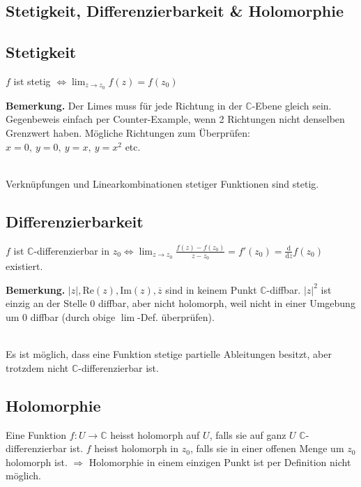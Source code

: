 \documentclass[8pt, a4paper, landscape, fleqn]{scrartcl}
\newenvironment {example}
				{\begin{itshape} \begin{small}}
				{\end{small} \end{itshape}}
\def\C{\mathbb{C}}
\def\d{\text{d}}
\def\Re{\text{Re}}
\def\Im{\text{Im}}
\newcommand{\blue}[1]{\textcolor{ethblue}{#1}}
\begin{document}
\begin{multicols*}{3}
		\section{Stetigkeit, Differenzierbarkeit \& Holomorphie}
		\subsection{Stetigkeit}
		$f$ ist \blue{stetig} $\Leftrightarrow \lim_{z \to z_0} f(z) = f(z_0)$ \vspace{5pt}
	
		\begin{example}
		    \textbf{Bemerkung.}
		    Der Limes muss für jede Richtung in der $\C$-Ebene gleich sein. Gegenbeweis einfach per Counter-Example, wenn 2 Richtungen nicht denselben Grenzwert haben. Mögliche Richtungen zum Überprüfen: $x = 0, \ y = 0, \ y = x, \ y = x^2$ etc.
		\end{example} \\
	    
	    Verknüpfungen und Linearkombinationen stetiger Funktionen sind stetig.
	
	    \subsection{Differenzierbarkeit}
	    $f$ ist \blue{$\C$-differenzierbar} in $z_0 \Leftrightarrow \lim_{z \to z_0} \frac{f(z)-f(z_0)}{z-z_0} = f'(z_0) = \frac{\d}{\d z}f(z_0)$ existiert. \\
	    
	    \begin{example}
		    \textbf{Bemerkung.}
		    $|z|, \Re(z), \Im(z), \overline{z}$ sind in keinem Punkt $\C$-diffbar. $|z|^2$ ist einzig an der Stelle 0 diffbar, aber nicht holomorph, weil nicht in einer Umgebung um 0 diffbar (durch obige $\lim$-Def. überprüfen).
		\end{example} \\
		
		Es ist möglich, dass eine Funktion stetige partielle Ableitungen besitzt, aber trotzdem nicht $\C$-differenzierbar ist. 
		
		
		\subsection{Holomorphie}
		Eine Funktion $f: U \to \C$ heisst \blue{holomorph auf $U$}, falls sie auf ganz $U$ $\C$-differenzierbar ist. $f$ heisst \blue{holomorph in $z_0$}, falls sie in einer offenen Menge um $z_0$ holomorph ist. $\Rightarrow$ Holomorphie in einem einzigen Punkt ist per Definition nicht möglich. \\
		

\end{multicols*}
\end{document}
